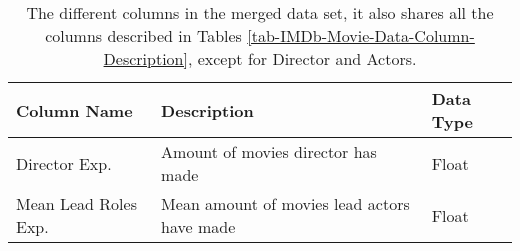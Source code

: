     \begin{table}[H]
        \centering
        \begin{tabular}{lp{9cm}l}
            \toprule
            Column Name          & Description                                 & Data Type \\
            \midrule
            Director Exp.        & Amount of movies director has made          & Float     \\
            Mean Lead Roles Exp. & Mean amount of movies lead actors have made & Float     \\
            \bottomrule
        \end{tabular}
        \caption[short]{The different columns in the merged data set,
            it also shares all the columns described in Tables
            \ref*{tab-IMDb-Movie-Data-Column-Description},
            except for Director and Actors.}\label{tab-merged-data-column-description}
    \end{table}

